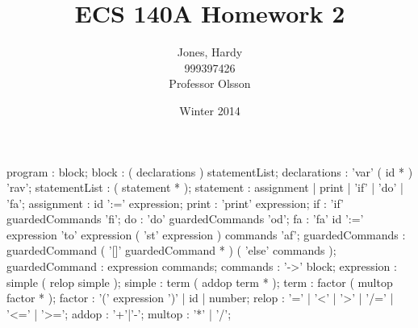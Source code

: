 \documentclass[12pt,letterpaper]{article}
\title{ECS 140A Homework 2\vspace{-2ex}}
\author{Jones, Hardy\\
        999397426\\
        Professor Olsson\vspace{-2ex}}
\date{Winter 2014}
\begin{document}
  \maketitle

  \begin{rail}
    program : block;
    block : ( declarations ) statementList;
    declarations : 'var' ( id * ) 'rav';
    statementList : ( statement * );
    statement : assignment | print | 'if' | 'do' | 'fa';
    assignment : id ':=' expression;
    print : 'print' expression;
    if : 'if' guardedCommands 'fi';
    do : 'do' guardedCommands 'od';
    fa : 'fa' id ':=' expression 'to' expression ( 'st' expression ) commands 'af';
    guardedCommands : guardedCommand ( '[]' guardedCommand * ) ( 'else' commands );
    guardedCommand : expression commands;
    commands : '->' block;
    expression : simple ( relop simple );
    simple : term ( addop term * );
    term : factor ( multop factor * );
    factor : '(' expression ')' | id | number;
    relop : '=' | '<' | '>' | '/=' | '<=' | '>=';
    addop : '+'|'-';
    multop : '*' | '/';
  \end{rail}
\end{document}
